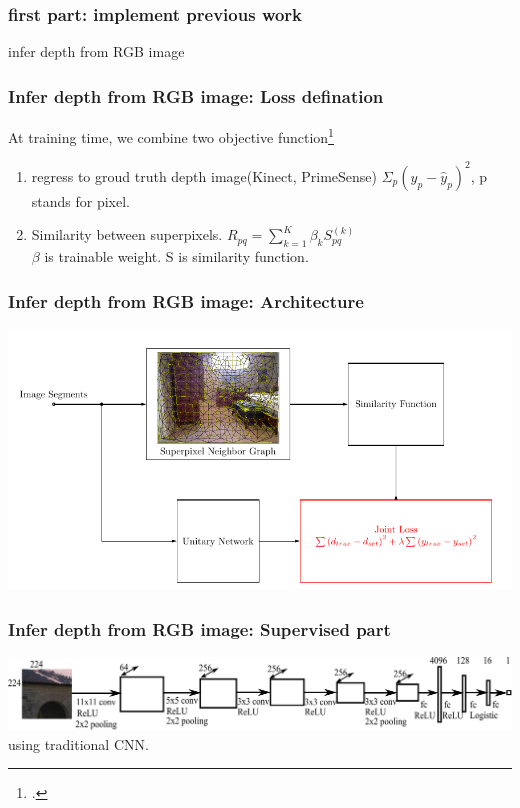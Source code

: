 \documentclass{beamer}
\begin{document}
\begin{frame}
\frametitle{first part: implement previous work}
\Huge{\centerline{infer depth from RGB image}}
\end{frame}

\begin{frame}
\frametitle{Infer depth from RGB image: Loss defination}
At training time, we combine two objective function\footcite{liu2015deep}
\begin{enumerate}
\item regress to groud truth depth image(Kinect, PrimeSense)
$ \Sigma_{p}(y_p-\hat{y}_p)^2$, p stands for pixel.
\item Similarity between superpixels.
$R_{pq} = \sum_{k=1}^K \beta_k S_{pq}^{(k)}$\\
 $\beta$ is trainable weight. S is similarity function.
\end{enumerate}
\end{frame}


\begin{frame}
\frametitle{Infer depth from RGB image: Architecture}
\hspace*{-1cm}
\includegraphics[width=1.2\textwidth]{arch.png}
\end{frame}


\begin{frame}
\frametitle{Infer depth from RGB image: Supervised part}
\includegraphics[width=\linewidth]{fig/cnn_unary.pdf}\\
using traditional CNN.
\end{frame}
\end{document}
